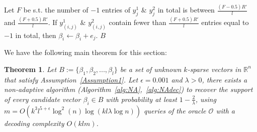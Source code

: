 \documentclass[10pt,a4paper]{amsart}
\newcommand\mc{\mathcal}
\newtheorem{theorem}{Theorem}[section]
\begin{document}
\begin{algorithm}
\begin{algorithmic}[1]
    \EndFor
    \begin{scriptsize}
    \end{scriptsize}
    \State Let $F$ be s.t. the number of $-1$ entries of $y_j^1$ $\&$ $y_j^2$ in total is between $\frac{(F-0.5)R'}{l}$ and $\frac{(F+0.5)R'}{l}$. 
    \State If $y_{(i,j)}^1$ $\&$ $y_{(i,j)}^2$ contain fewer than $\frac{(F+0.5)R'}{l}$ entries equal to $-1$ in total, then $\beta_i\leftarrow\beta_i+e_j$.
    \EndFor
    \State \Return $B$ 
\end{algorithmic}
\end{algorithm}

We have the following main theorem for this section: 

\begin{theorem}\label{thm3}
    Let $B:=\{\beta_1,\beta_2,...,\beta_l\}$ be a set of unknown $k$-sparse vectors in $\mathbb{R}^n$ that satisfy Assumption~\ref{Assumption1}. Let $\epsilon=0.001$ and $\lambda>0$,  there exists a non-adaptive algorithm (Algorithm~\ref{alg:NA},~\ref{alg:NAdec}) to recover the support of every candidate vector $\beta_i\in B$ with probability at least $1 - \frac{2}{\lambda}$, using $m=O(k^3l^{5+\epsilon}\log^2(n)\log(kl\lambda\log n))$ queries of the oracle $\mc{O}$ with a decoding complexity $O(klm)$. 
\end{theorem}



\end{document}
